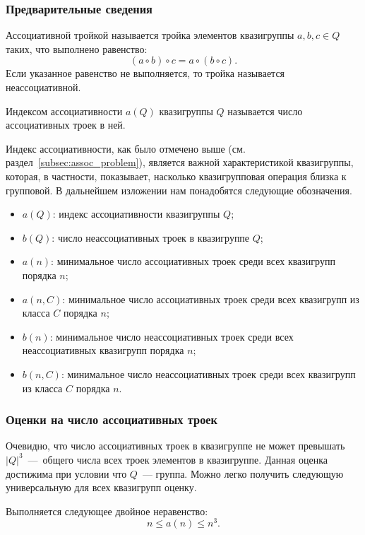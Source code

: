 \subsubsection{Предварительные сведения}

    \begin{definition}
        Ассоциативной тройкой называется тройка элементов квазигруппы $a, b, c \in Q$ таких, что выполнено равенство:
        \[
            (a \circ b) \circ c = a \circ (b \circ c).
        \]
        Если указанное равенство не выполняется, то тройка называется неассоциативной.
    \end{definition}

    \begin{definition}
        Индексом ассоциативности $a(Q)$ квазигруппы $Q$ называется число ассоциативных троек в ней.
    \end{definition}

    Индекс ассоциативности, как было отмечено выше (см. раздел~\ref{subsec:assoc_problem}), является важной характеристикой квазигруппы, которая, в частности, показывает, насколько квазигрупповая операция близка к групповой.
    В дальнейшем изложении нам понадобятся следующие обозначения.
    \begin{itemize}
        \item $a(Q)$: индекс ассоциативности квазигруппы $Q$;
        \item $b(Q)$: число неассоциативных троек в квазигруппе $Q$;
        \item $a(n)$: минимальное число ассоциативных троек среди всех квазигрупп порядка $n$;
        \item $a(n, C)$: минимальное число ассоциативных троек среди всех квазигрупп из класса $C$ порядка $n$;
        \item $b(n)$: минимальное число неассоциативных троек среди всех неассоциативных квазигрупп порядка $n$;
        \item $b(n, C)$: минимальное число неассоциативных троек среди всех квазигрупп из класса $C$ порядка $n$.
    \end{itemize}

\subsubsection{Оценки на число ассоциативных троек}

    Очевидно, что число ассоциативных троек в квазигруппе не может превышать $\lvert Q \rvert^3$~---~общего числа всех троек элементов в квазигруппе.
    Данная оценка достижима при условии что $Q$~--- группа.
    Можно легко получить следующую универсальную для всех квазигрупп оценку.
    \begin{proposition}
        Выполняется следующее двойное неравенство:
        \[
            n \le a(n) \le n^3.
        \]
    \end{proposition}

